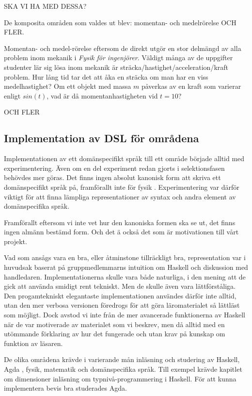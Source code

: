 \begin{binge}
SKA VI HA MED DESSA? 

De komposita områden som valdes ut blev: momentan- och medelrörelse OCH FLER.

  Momentan- och medel-rörelse eftersom de direkt utgör en stor delmängd
  av alla problem inom mekanik i \textit{Fysik för ingenjörer}. Väldigt många av
  de uppgifter studenter lär sig lösa inom mekanik är
  sträcka/hastighet/acceleration/kraft problem. Hur lång tid tar det att åka en
  sträcka om man har en viss medelhastighet? Om ett objekt med massa $m$
  påverkas av en kraft som varierar enligt $sin(t)$, vad är då
  momentanhastigheten vid $t=10$?
  
OCH FLER

\subsection{Implementation av DSL för områdena}

Implementationen av ett domänspecifikt språk till ett område började alltid med
experimentering. Även om en del experiment redan gjorts i selektionsfasen
behövdes mer göras. Det finns ingen absolut kanonisk form  att skriva ett domänspecifikt språk på, framförallt inte för
fysik . Experimentering var därför viktigt för att finna
lämpliga representationer av syntax och andra element av domänspecifika språk.


Framförallt eftersom vi inte vet hur den kanoniska formen ska se ut, det finns ingen almänn bestämd form. Och det ä också det som är motivationen till vårt projekt. 

Vad som ansågs vara en bra, eller åtminstone tillräckligt bra, representation
var i huvudsak baserat på gruppmedlemmarns intuition om Haskell och diskussion
med handledaren. Implementationerna skulle vara både naturliga, i den mening
att de gick att använda smidigt rent tekniskt. Men de skulle även vara
lättförståliga. Den progamtekniskt elegantaste implementationen användes därför
inte alltid, utan den mer verbosa versionen föredrogs för att göra
läromaterialet så lättläst som möjligt. Dock avstod vi inte från de mer
avancerade funktionerna av Haskell när de var motiverade av materialet som vi
beskrev, men då alltid med en utömmande förklaring av hur det fungerade och utan
krav på kunskap om funktion av läsaren.


De olika områdena krävde i varierande mån inläsning och studering av Haskell,
Agda , fysik, matematik och domänspecifika språk. Till
exempel krävde kapitlet om dimensioner inläsning om typnivå-programmering i
Haskell. För att kunna implementera bevis bra studerades Agda.


\end{binge}
